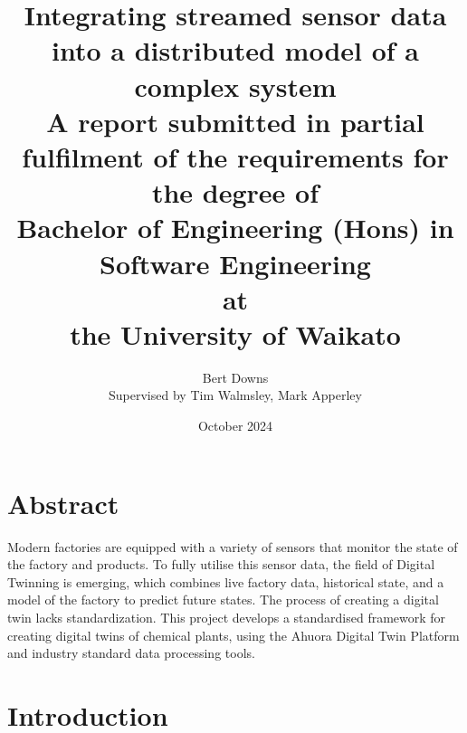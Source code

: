 \documentclass[12pt]{book}
\title{Integrating streamed sensor data into a distributed model of a complex system \\
\large{A report submitted in partial fulfilment of the requirements for the degree of \\
\textbf{Bachelor of Engineering (Hons) in Software Engineering} \\
at \\
\textbf{the University of Waikato}
}}
\author{Bert Downs  \\ 
Supervised by Tim Walmsley, Mark Apperley }
\date{October 2024}
\begin{document}
\maketitle

\newpage

\chapter*{Abstract}

Modern factories are equipped with a variety of sensors that monitor the state of the factory and products. To fully utilise this sensor data, the field of Digital Twinning is emerging, which combines live factory data, historical state, and a model of the factory to predict future states. The process of creating a digital twin lacks standardization. This project develops a standardised framework for creating digital twins of chemical plants, using the Ahuora Digital Twin Platform and industry standard data processing tools.  


\newpage
\tableofcontents



\newpage




\chapter{Introduction}




\begin{appendices}





% 

%     


% 

\end{appendices}
\end{document}

